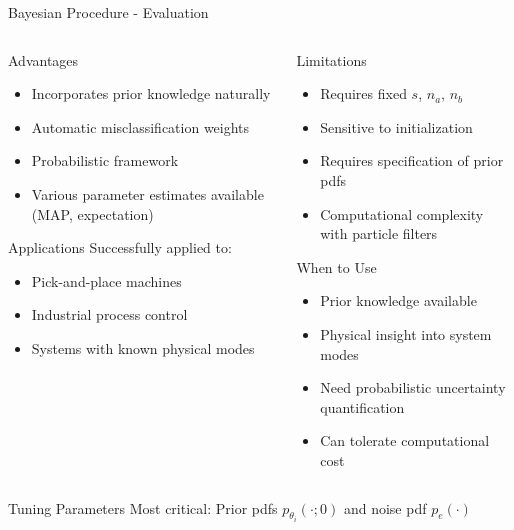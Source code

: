 \documentclass[aspectratio=169]{beamer}
\begin{document}
\begin{frame}{Bayesian Procedure - Evaluation}
\begin{columns}[t]
\begin{column}{0.5\textwidth}
\begin{block}{Advantages}
\begin{itemize}
\item Incorporates prior knowledge naturally
\item Automatic misclassification weights
\item Probabilistic framework
\item Various parameter estimates available (MAP, expectation)
\end{itemize}
\end{block}

\begin{exampleblock}{Applications}
Successfully applied to:
\begin{itemize}
\item Pick-and-place machines \cite{juloski2004data}
\item Industrial process control
\item Systems with known physical modes
\end{itemize}
\end{exampleblock}
\end{column}
\begin{column}{0.5\textwidth}
\begin{block}{Limitations}
\begin{itemize}
\item Requires fixed $s$, $n_a$, $n_b$
\item Sensitive to initialization
\item Requires specification of prior pdfs
\item Computational complexity with particle filters
\end{itemize}
\end{block}

\begin{alertblock}{When to Use}
\begin{itemize}
\item Prior knowledge available
\item Physical insight into system modes
\item Need probabilistic uncertainty quantification
\item Can tolerate computational cost
\end{itemize}
\end{alertblock}
\end{column}
\end{columns}

\vspace{0.3cm}
\begin{block}{Tuning Parameters}
Most critical: Prior pdfs $p_{\theta_i}(\cdot; 0)$ and noise pdf $p_e(\cdot)$
\end{block}
\end{frame}
\end{document}
